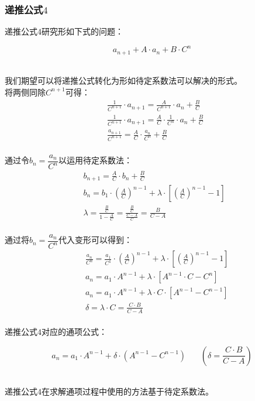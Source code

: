 \documentclass[UTF8]{ctexart}
\begin{document}
\newpage

\subsubsection{递推公式$4$}
    \setcounter{equation}{0}
    递推公式$4$研究形如下式的问题：
    \begin{large}
        \begin{equation*}
            a_{n+1}+A\cdot a_n+B\cdot C^n
        \end{equation*}
    \end{large}\\
    我们期望可以将递推公式转化为形如待定系数法可以解决的形式。\\[3mm]
    将两侧同除$C^{n+1}$可得：
    \begin{align}
        &\frac{1}{C^{n+1}}\cdot a_{n+1}=\frac{A}{C^{n+1}}\cdot a_n+\frac{B}{C}\\[3mm]
        &\frac{1}{C^{n+1}}\cdot a_{n+1}=\frac{A}{C}\cdot\frac{1}{C^n}\cdot a_n+\frac{B}{C}\\[3mm]
        &\frac{a_{n+1}}{C^{n+1}}=\frac{A}{C}\cdot\frac{a_n}{C^n}+\frac{B}{C}
    \end{align}\\
    通过令$b_n=\dfrac{a_n}{C^n}$以运用待定系数法：
    \begin{align}
        &b_{n+1}=\frac{A}{C}\cdot b_n+\frac{B}{C}\\[3mm]
        &b_n=b_1\cdot\left(\frac{A}{C}\right)^{n-1}+\lambda\cdot\left[\left(\frac{A}{C}\right)^{n-1}-1\right]~\\[3mm]
        &\lambda=\frac{\frac{B}{C}}{1-\frac{A}{C}}=\frac{\frac{B}{C}}{\frac{C-A}{C}}=\frac{B}{C-A}
    \end{align}\\
    通过将$b_n=\dfrac{a_n}{C^n}$代入变形可以得到：
    \begin{align}
        &~~\frac{a_n}{C^{n}}=\frac{a_1}{C^{1}}\cdot\left(\frac{A}{C}\right)^{n-1}+\lambda\cdot\left[\left(\frac{A}{C}\right)^{n-1}-1\right]\\[3mm]
        &~~a_n=a_1\cdot A^{n-1}+\lambda\cdot\left[A^{n-1}\cdot C-C^n\right]\\[3mm]
        &~~a_n=a_1\cdot A^{n-1}+\lambda\cdot C\cdot \left[A^{n-1}-C^{n-1}\right]\\[3mm]
        &~~\delta=\lambda\cdot C=\frac{C\cdot B}{C-A}
    \end{align}\\
    递推公式$4$对应的通项公式：
    \begin{large}
        \begin{equation*}
            a_n=a_1\cdot A^{n-1}+\delta\cdot (A^{n-1}-C^{n-1})~~~~~~~~\left(\delta=\frac{C\cdot B}{C-A}\right)
        \end{equation*}
    \end{large}\\
    递推公式$4$在求解通项过程中使用的方法基于待定系数法。
\end{document}
